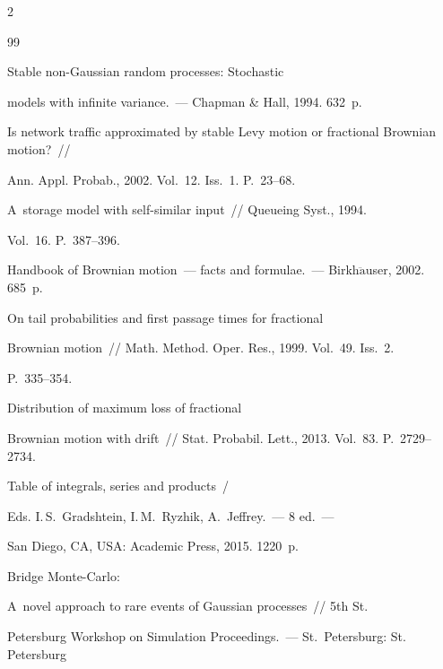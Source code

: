 \begin{multicols}{2}
{{\begin{thebibliography}{99}

 Stable non-Gaussian random processes: Stochastic 

models with infinite variance.~--- Chapman \& Hall, 1994. 632~p.



Is network traffic approximated by stable Levy motion or fractional Brownian motion?~// 

Ann. Appl. Probab., 2002. Vol.~12. Iss.~1. P.~23--68.


 A~storage model with self-similar input~// Queueing Syst., 1994. 

Vol.~16. P.~387--396.



 Handbook of Brownian motion~--- facts and formulae.~--- Birkh$\ddot{\mbox{a}}$user, 2002. 685~p.


 On tail probabilities and first passage times for fractional 

Brownian motion~// Math. Method. Oper. Res., 1999. Vol.~49. Iss.~2. 

P.~335--354.


 Distribution of maximum loss of fractional 

Brownian motion with drift~// Stat. Probabil. Lett., 2013. Vol.~83. P.~2729--2734.


Table of integrals, series and products~/

Eds.  I.\,S.~Gradshtein, I.\,M.~Ryzhik, A.~Jeffrey.~--- 8 ed.~---


San Diego, CA, USA: Academic Press, 2015. 1220~p.


 Bridge Monte-Carlo: 

A~novel approach to rare events of Gaussian processes~// 5th St.\ 

Petersburg Workshop on Simulation Proceedings.~--- St.\ Petersburg: St. Petersburg 


\end{thebibliography}}}
\end{multicols}

